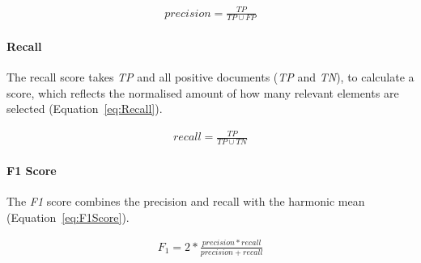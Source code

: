 \begin{equation} \label{eq:Precision}
\begin{gathered}
precision = \frac{TP}{TP \cup  FP}
\end{gathered}
\end{equation}

\paragraph{Recall}
\label{sub:recall}

The recall score takes \textit{TP} and all positive documents (\textit{TP} and \textit{TN}), to calculate a score, which reflects the normalised amount of how many relevant elements are selected (Equation~\ref{eq:Recall}).

\begin{equation} \label{eq:Recall}
\begin{gathered}
recall = \frac{TP}{TP \cup  TN}
\end{gathered}
\end{equation}

\paragraph{F1 Score}
\label{sub:F1Score}
The \textit{F1} score combines the precision and recall with the harmonic mean (Equation~\ref{eq:F1Score}).

\begin{equation} \label{eq:F1Score}
\begin{gathered}
F_{1} = 2 * \frac{precision * recall}{precision + recall}
\end{gathered}
\end{equation}

